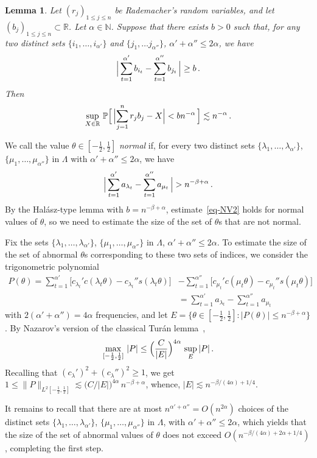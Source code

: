 \documentclass[11pt]{amsart}
\numberwithin{equation}{section}
\newtheorem{lemma}{Lemma}[section]
\newcommand{\bR}{\mathbb R}
\newcommand{\bN}{\mathbb N}
\newcommand{\bP}{\mathbb P}
\begin{document}
\begin{lemma}\label{lemma-Halasz}
Let $(r_j)_{1\le j \le n}$ be Rademacher's random variables, and let $(b_j)_{1\le j \le n}\subset\bR$. Let $\alpha\in\bN$. Suppose that there exists $b>0$ such that,
for any two distinct sets $\{i_1, \ldots , i_{\alpha'}\}$ and $\{j_1,  \ldots j_{\alpha''}\}$, $\alpha'+\alpha''\le 2\alpha$, we have
\[
\Bigl|\, \sum_{t=1}^{\alpha'} b_{i_t} - \sum_{t=1}^{\alpha''} b_{j_t} \,\Bigr| \ge b\,.
\]
Then
\[
\sup_{X\in\bR}\,
\bP \Bigl[\, \Bigl| \sum_{j=1}^n r_j b_j - X \Bigr| < b n^{-\alpha}\, \Bigr]
\lesssim n^{-\alpha}\,.
\]
\end{lemma}

We call the value $\theta\in [-\tfrac12, \tfrac12]$ {\em normal} if, for every two distinct
sets $\{\lambda_1, \ldots , \lambda_{\alpha'}\}$, $\{\mu_1, \ldots , \mu_{\alpha''}\}$
in $\Lambda$ with $\alpha'+\alpha'' \le 2\alpha$, we have
\[
\Bigl|\,
\sum_{t=1}^{\alpha'} a_{\lambda_t} - \sum_{t=1}^{\alpha''} a_{\mu_t}
\,\Bigr| > n^{-\beta+\alpha}\,.
\]
By the Hal\'asz-type lemma with $b=n^{-\beta+\alpha}$, estimate~\eqref{eq-NV2} holds for normal values
of $\theta$, so we need to estimate the size of the set of $\theta$s that are not normal.

Fix the sets
$\{\lambda_1, \ldots , \lambda_{\alpha'}\}$, $\{\mu_1, \ldots , \mu_{\alpha''}\}$
in $\Lambda$, $\alpha'+\alpha'' \le 2\alpha$. To estimate the size of the set of abnormal
$\theta$s corresponding to these two sets of indices, we consider the trigonometric polynomial
\begin{align*}
P(\theta)
= \sum_{t=1}^{\alpha'} \bigl[ c_{\lambda_t}' c(\lambda_t\theta) - c_{\lambda_t}''s(\lambda_t\theta) \bigr]
&- \sum_{t=1}^{\alpha''} \bigl[ c_{\mu_t}' c(\mu_t\theta) - c_{\mu_t}''s(\mu_t\theta) \bigr] \\
&= \sum_{t=1}^{\alpha'} a_{\lambda_t} - \sum_{t=1}^{\alpha''} a_{\mu_t}
\end{align*}
with $2(\alpha'+\alpha'')=4\alpha$ frequencies, and let
$E=\{\theta\in [-\tfrac12, \tfrac12]\colon |P(\theta)|\le n^{-\beta+\alpha}\}$.
By Nazarov's version of the classical Tur\'an lemma~\cite[Section~1.1]{Nazarov},
\[
\max_{[-\frac12, \frac12]}\, |P| \le \Bigl( \frac{C}{|E|} \Bigr)^{4\alpha}\, \sup_E |P|\,.
\]
Recalling that $(c_\lambda')^2 + (c_\lambda'')^2 \ge 1$, we get
$ 1 \le \| P \|_{L^2[-\frac12, \frac12]}
\lesssim \bigl( C/|E| \bigr)^{4\alpha}\, n^{-\beta+\alpha} $, whence,
$ |E| \lesssim n^{-\beta/(4\alpha) + 1/4}$.

It remains to recall that there are at most
$n^{\alpha'+\alpha''} = O(n^{2\alpha})$ choices of the
distinct sets $\{\lambda_1, \ldots , \lambda_{\alpha'}\}$, $\{\mu_1, \ldots , \mu_{\alpha''}\}$
in $\Lambda$, with $\alpha'+\alpha'' \le 2\alpha$, which yields that the size of the set
of abnormal values of $\theta$ does not exceed
$O(n^{-\beta/(4\alpha) + 2\alpha + 1/4})$,
completing the first step.
\end{document}
